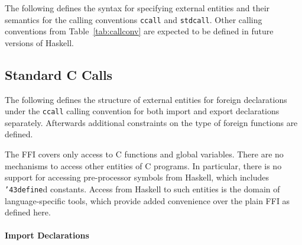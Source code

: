 The following defines the syntax for specifying external entities and their
semantics for the calling conventions \mbox{\tt ccall} and \mbox{\tt stdcall}.  Other
calling conventions from Table~\ref{tab:callconv} are expected to be defined
in future versions of Haskell.


\subsection{Standard C Calls}
\label{sec:ccall}

The following defines the structure of external entities for foreign
declarations under the \mbox{\tt ccall} calling convention for both import and
export declarations separately.  Afterwards additional constraints on the type
of foreign functions are defined.

The FFI covers only access to C functions and global variables.  There are no
mechanisms to access other entities of C programs.  In particular, there is no
support for accessing pre-processor symbols from Haskell, which includes
\mbox{\tt {\char'43}define}d constants.  Access from Haskell to such entities is the
domain of language-specific tools, which provide added convenience over the
plain FFI as defined here.

\paragraph{Import Declarations}

